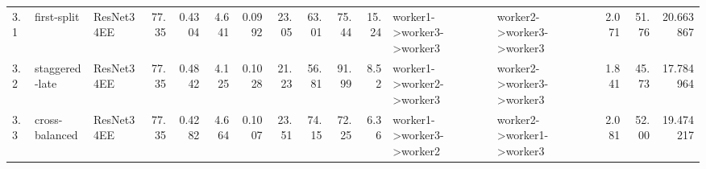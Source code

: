 \begin{table}
\begin{tabular}{lllrrrrrrrrllrrr}
       3.1 &    first-split & ResNet34EE &     77.35 &          0.4304 &       4.641 &                      0.0992 &                             23.05 &         63.01 &         75.44 &         15.24 & worker1->worker3->worker3 & worker2->worker3->worker3 &            2.071 &                         51.76 &                             20.663867 \\
       3.2 & staggered-late & ResNet34EE &     77.35 &          0.4842 &       4.125 &                      0.1028 &                             21.23 &         56.81 &         91.99 &          8.52 & worker1->worker2->worker3 & worker2->worker3->worker3 &            1.841 &                         45.73 &                             17.784964 \\
       3.3 & cross-balanced & ResNet34EE &     77.35 &          0.4282 &       4.664 &                      0.1007 &                             23.51 &         74.15 &         72.25 &          6.36 & worker1->worker3->worker2 & worker2->worker1->worker3 &            2.081 &                         52.00 &                             19.474217 \\
\bottomrule
\end{tabular}
\end{table}
